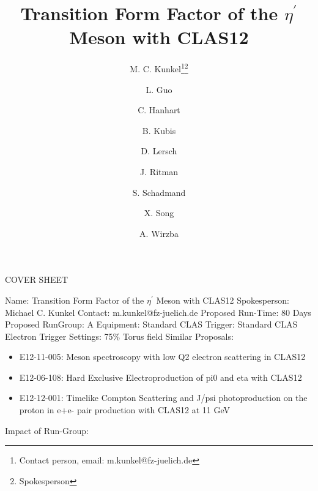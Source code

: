 \documentclass[11pt,a4paper]{article}
\title{Transition Form Factor of the $\eta^{\prime}$ Meson with CLAS12}
\date{}
\author[1]{M. C. Kunkel\thanks{Contact person, email: m.kunkel@fz-juelich.de}\thanks{Spokesperson}}
\author[3]{L. Guo}
\author[1]{C. Hanhart}
\author[4]{B. Kubis}
\author[1]{D. Lersch}
\author[1]{J. Ritman} %
\author[1]{S. Schadmand}
\author[1]{X. Song}
\author[1]{A. Wirzba}
\affil[1]{Forschungszentrum J\"ulich, J\"ulich (Germany)}
\affil[3]{Florida International University (U.S.A.)}
\affil[4]{University of Bonn (Germany)}
\begin{document}
\begin{titlepage}
		\begin{center}
			\LARGE{COVER SHEET} 		\newline \newline
		\end{center}

     \begin{flushleft}
			Name: Transition Form Factor of the $\eta^{\prime}$ Meson with CLAS12 \newline \newline
			Spokesperson: Michael C. Kunkel \newline \newline
			Contact: m.kunkel@fz-juelich.de \newline \newline
			Proposed Run-Time: 80 Days \newline \newline
			Proposed RunGroup: A \newline \newline
			Equipment: Standard CLAS \newline \newline
			Trigger: Standard CLAS Electron Trigger \newline \newline
			Settings: 75\% Torus field \newline \newline
			Similar Proposals: 
			\begin{itemize}
				\item E12-11-005: Meson spectroscopy with low Q2 electron scattering in CLAS12 
				\item E12-06-108: Hard Exclusive Electroproduction of pi0 and eta with CLAS12
				\item E12-12-001: Timelike Compton Scattering and J/psi photoproduction on the proton in e+e- pair production with CLAS12 at 11 GeV
			\end{itemize}
			Impact of Run-Group: 
		\end{flushleft}
	\end{titlepage}
\maketitle
\thispagestyle{firststyle}
\end{document}
